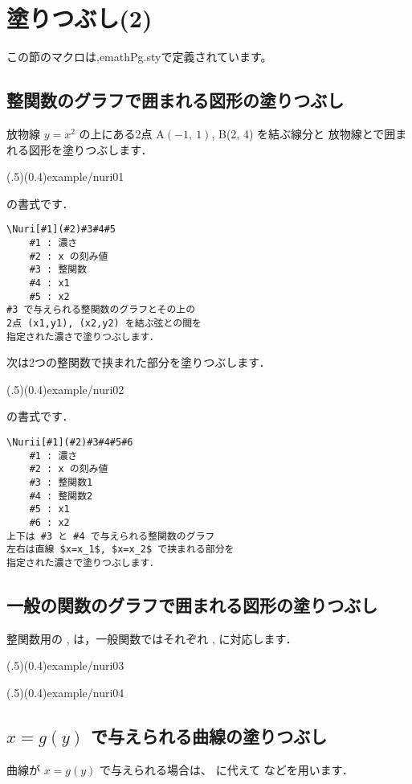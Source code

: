 \section{塗りつぶし(2)}
この節のマクロは,\textsf{emathPg.sty}で定義されています。

\subsection{整関数のグラフで囲まれる図形の塗りつぶし}
放物線 $y=x^2$ の上にある2点 A$(-1,~1)$, B(2, 4) を結ぶ線分と
放物線とで囲まれる図形を塗りつぶします．

\showexample[放物線と弦で囲まれる図形](.5)(0.4){example/nuri01}

の書式です．
\begin{boxnote}
\begin{verbatim}
\Nuri[#1](#2)#3#4#5
    #1 : 濃さ
    #2 : x の刻み値
    #3 : 整関数
    #4 : x1
    #5 : x2
#3 で与えられる整関数のグラフとその上の
2点 (x1,y1), (x2,y2) を結ぶ弦との間を
指定された濃さで塗りつぶします．
\end{verbatim}
\end{boxnote}

次は2つの整関数で挟まれた部分を塗りつぶします．

\showexample[2つの放物線で囲まれる図形](.5)(0.4){example/nuri02}

の書式です．
\begin{boxnote}
\begin{verbatim}
\Nurii[#1](#2)#3#4#5#6
    #1 : 濃さ
    #2 : x の刻み値
    #3 : 整関数1
    #4 : 整関数2
    #5 : x1
    #6 : x2
上下は #3 と #4 で与えられる整関数のグラフ
左右は直線 $x=x_1$, $x=x_2$ で挟まれる部分を
指定された濃さで塗りつぶします．
\end{verbatim}
\end{boxnote}

\subsection{一般の関数のグラフで囲まれる図形の塗りつぶし}
整関数用の ,  は，一般関数ではそれぞれ
,  に対応します．

\showexample[一般関数と弦で囲まれる図形](.5)(0.4){example/nuri03}

\showexample[2つの一般関数で囲まれる図形](.5)(0.4){example/nuri04}

\subsection{$x=g(y)$ で与えられる曲線の塗りつぶし}
曲線が $x=g(y)$ で与えられる場合は、 に代えて 
などを用います．

